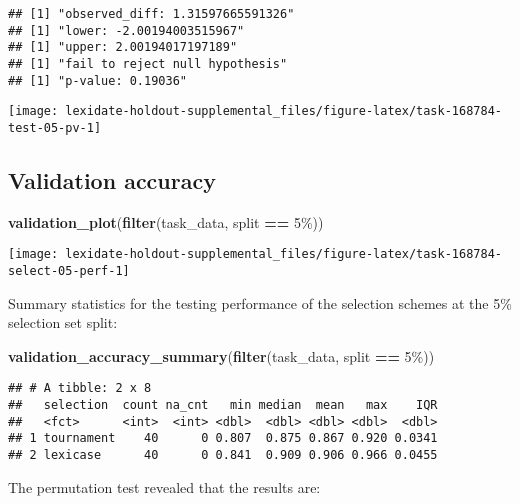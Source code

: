 \documentclass[
]{book}
\newenvironment{Shaded}{\begin{snugshade}}{\end{snugshade}}
\newcommand{\FunctionTok}[1]{\textcolor[rgb]{0.13,0.29,0.53}{\textbf{#1}}}
\newcommand{\NormalTok}[1]{#1}
\newcommand{\SpecialCharTok}[1]{\textcolor[rgb]{0.81,0.36,0.00}{\textbf{#1}}}
\newcommand{\StringTok}[1]{\textcolor[rgb]{0.31,0.60,0.02}{#1}}
\begin{document}
\begin{verbatim}
## [1] "observed_diff: 1.31597665591326"
## [1] "lower: -2.00194003515967"
## [1] "upper: 2.00194017197189"
## [1] "fail to reject null hypothesis"
## [1] "p-value: 0.19036"
\end{verbatim}

\texttt{[image: lexidate-holdout-supplemental\_files/figure-latex/task-168784-test-05-pv-1]}

\hypertarget{validation-accuracy-50}{%
\subsection{Validation accuracy}\label{validation-accuracy-50}}

\begin{Shaded}
\begin{Highlighting}[]
\FunctionTok{validation\_plot}\NormalTok{(}\FunctionTok{filter}\NormalTok{(task\_data, split }\SpecialCharTok{==} \StringTok{\textquotesingle{}5\%\textquotesingle{}}\NormalTok{))}
\end{Highlighting}
\end{Shaded}

\texttt{[image: lexidate-holdout-supplemental\_files/figure-latex/task-168784-select-05-perf-1]}

Summary statistics for the testing performance of the selection schemes at the 5\% selection set split:

\begin{Shaded}
\begin{Highlighting}[]
\FunctionTok{validation\_accuracy\_summary}\NormalTok{(}\FunctionTok{filter}\NormalTok{(task\_data, split }\SpecialCharTok{==} \StringTok{\textquotesingle{}5\%\textquotesingle{}}\NormalTok{))}
\end{Highlighting}
\end{Shaded}

\begin{verbatim}
## # A tibble: 2 x 8
##   selection  count na_cnt   min median  mean   max    IQR
##   <fct>      <int>  <int> <dbl>  <dbl> <dbl> <dbl>  <dbl>
## 1 tournament    40      0 0.807  0.875 0.867 0.920 0.0341
## 2 lexicase      40      0 0.841  0.909 0.906 0.966 0.0455
\end{verbatim}

The permutation test revealed that the results are:
\end{document}

